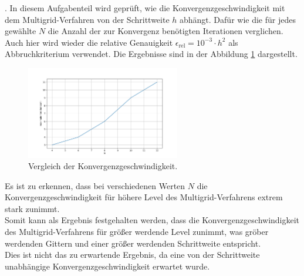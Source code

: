 \documentclass[11pt,a4paper]{article}
\begin{document}
. In diesem Aufgabenteil wird geprüft, wie die Konvergenzgeschwindigkeit mit dem Multigrid-Verfahren von der Schrittweite $h$ abhängt. Dafür wie die für jedes gewählte $N$ die Anzahl
der zur Konvergenz benötigten Iterationen verglichen. Auch hier wird wieder die relative Genauigkeit $\epsilon_{\mathrm{rel}} = 10^{-3} \cdot h^2$ als Abbruchkriterium verwendet. Die Ergebnisse sind in der Abbildung
\ref{fig:h2_last_plot} dargestellt.
\begin{figure}[ht]
    \centering
    \includegraphics[width=0.6\textwidth]{h2_last_plot}
    \caption[Vergleich der Konvergenzgeschwindigkeit.]{Vergleich der Konvergenzgeschwindigkeit.}\label{fig:h2_last_plot}
\end{figure} Es ist zu erkennen, dass bei verschiedenen Werten $N$ die Konvergenzgeschwindigkeit für höhere Level des Multigrid-Verfahrens extrem stark zunimmt. \\
Somit kann als Ergebnis festgehalten werden,
 dass die Konvergenzgeschwindigkeit des Multigrid-Verfahrens für größer werdende Level zunimmt, was gröber werdenden Gittern und einer größer werdenden Schrittweite entspricht.\\
Dies ist nicht das zu erwartende Ergebnis, da eine von der Schrittweite unabhängige Konvergenzgeschwindigkeit erwartet wurde.

\newpage

\listoffigures
\end{document}
